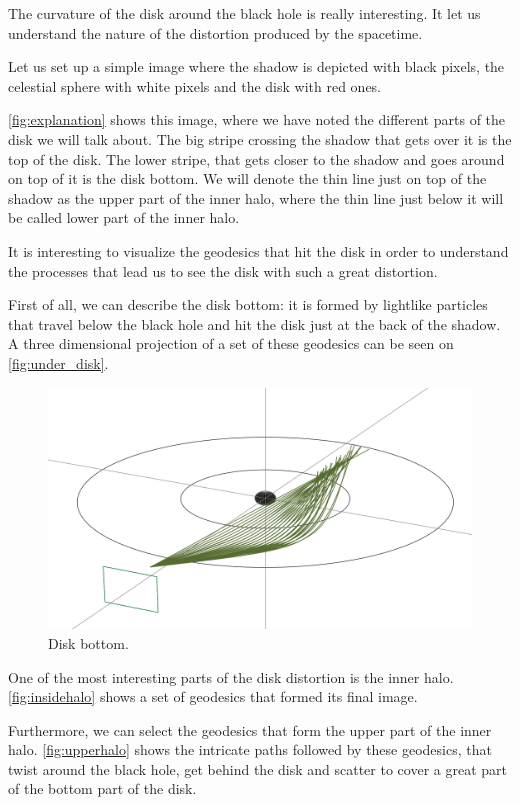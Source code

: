 The curvature of the disk around the black hole is really interesting. It let us understand the nature of the distortion produced by the spacetime.

Let us set up a simple image where the shadow is depicted with black pixels, the celestial sphere with white pixels and the disk with red ones.

\autoref{fig:explanation} shows this image, where we have noted the different parts of the disk we will talk about. The big stripe crossing the shadow that gets over it is the top of the disk. The lower stripe, that gets closer to the shadow and goes around on top of it is the disk bottom. We will denote the thin line just on top of the shadow as the upper part of the inner halo, where the thin line just below it will be called lower part of the inner halo.

It is interesting to visualize the geodesics that hit the disk in order to understand the processes that lead us to see the disk with such a great distortion.

First of all, we can describe the disk bottom: it is formed by lightlike particles that travel below the black hole and hit the disk just at the back of the shadow. A three dimensional projection of a set of these geodesics can be seen on \autoref{fig:under_disk}.

\begin{figure}[bth]
	\myfloatalign
	\includegraphics[width=.65\linewidth]{gfx/under_disk}
	\caption[Disk bottom]{Disk bottom.}
	\label{fig:under_disk}
\end{figure}

One of the most interesting parts of the disk distortion is the inner halo. \autoref{fig:insidehalo} shows a set of geodesics that formed its final image.

Furthermore, we can select the geodesics that form the upper part of the inner halo. \autoref{fig:upperhalo} shows the intricate paths followed by these geodesics, that twist around the black hole, get behind the disk and scatter to cover a great part of the bottom part of the disk.

